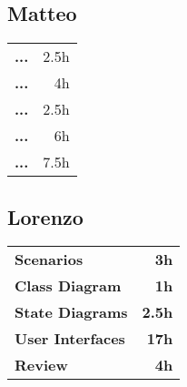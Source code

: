 \subsection*{Matteo}
\begin{table}[H]
    \begin{tabular}{lr}
        \toprule
        \textbf{...} & 2.5h \\
        \textbf{...} & 4h   \\
        \textbf{...} & 2.5h \\
        \textbf{...} & 6h   \\
        \textbf{...} & 7.5h \\
        \bottomrule
    \end{tabular}
\end{table}

\subsection*{Lorenzo}
\begin{table}[H]
    \begin{tabular}{lr}
        \toprule
        \textbf{Scenarios}       & \textbf{3h}   \\
        \textbf{Class Diagram}   & \textbf{1h}   \\
        \textbf{State Diagrams}  & \textbf{2.5h} \\
        \textbf{User Interfaces} & \textbf{17h}  \\
        \textbf{Review}          & \textbf{4h}   \\
        \bottomrule
    \end{tabular}
\end{table}
